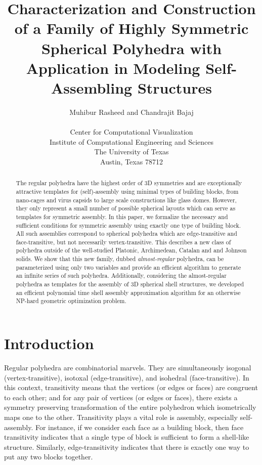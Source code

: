 \documentclass[11pt]{article}
\newcommand{\1}{\mathds{1}}
\begin{document}
 


\title{\textbf{Characterization and Construction of a Family of Highly Symmetric Spherical Polyhedra with Application in Modeling Self-Assembling Structures}}
\author{Muhibur Rasheed and Chandrajit Bajaj\\~\\ Center for Computational Visualization \\ Institute of Computational Engineering and Sciences \\ The University of Texas  \\ Austin, Texas 78712}


\date{} 
\maketitle
\thispagestyle{empty}


\begin{abstract}
The regular polyhedra have the highest order of 3D symmetries and are exceptionally attractive templates for (self)-assembly using minimal types of building blocks, from nano-cages and virus capsids to large scale constructions like glass domes. However, they only represent a small number of possible spherical layouts which can serve as templates for symmetric assembly. In this paper, we formalize the necessary and sufficient conditions for symmetric assembly using exactly one type of building block. All such assemblies correspond to spherical polyhedra which are edge-transitive and face-transitive, but not necessarily vertex-transitive. This describes a new class of polyhedra outside of the well-studied Platonic, Archimedean, Catalan and and Johnson solids. We show that this new family, dubbed \emph{almost-regular} polyhedra, can be parameterized using only two variables and provide an efficient algorithm to generate an infinite series of such polyhedra. Additionally, considering the almost-regular polyhedra as templates for the assembly of 3D spherical shell structures, we developed an efficient polynomial time shell assembly approximation algorithm for an otherwise NP-hard geometric optimization problem.
\end{abstract}

\section{Introduction}
\label{sec:intro}
Regular polyhedra are combinatorial marvels. They are simultaneously isogonal (vertex-transitive), isotoxal (edge-transitive), and isohedral (face-transitive). In this context, transitivity means that the vertices (or edges or faces) are congruent to each other; and for any pair of vertices (or edges or faces), there exists a symmetry preserving transformation of the entire polyhedron which isometrically maps one to the other. Transitivity plays a vital role is assembly, especially self-assembly. For instance, if we consider each face as a building block, then face transitivity indicates that a single type of block is sufficient to form a shell-like structure. Similarly, edge-transitivity indicates that there is exactly one way to put any two blocks together. 
\end{document}
